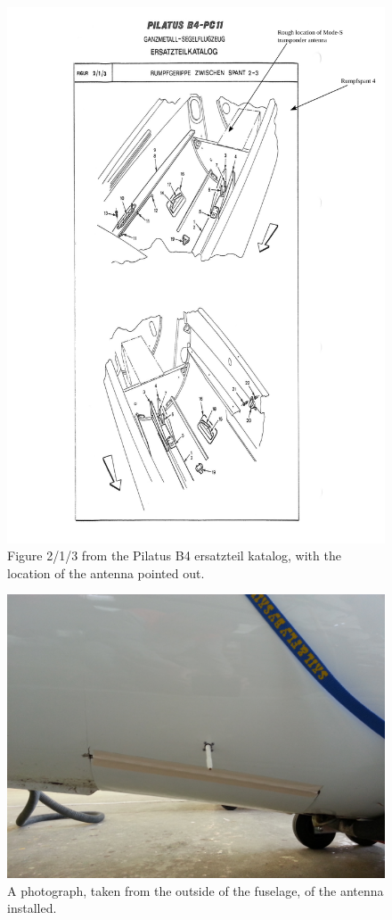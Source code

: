 \documentclass[twoside]{article}
\begin{document}
\begin{figure}
\includegraphics[width=\textwidth,keepaspectratio]{b4_ersatzteil_katalog_fig_2_1_3_annotated}
\caption{Figure 2/1/3 from the Pilatus B4 ersatzteil katalog, with the location of the antenna pointed out.}
\label{fig:ersatzteil_antenna}
\end{figure}

\begin{figure}
\includegraphics[width=\textwidth,keepaspectratio]{outside}
\caption{A photograph, taken from the outside of the fuselage, of the antenna installed.}
\label{fig:outside}
\end{figure}
\end{document}
